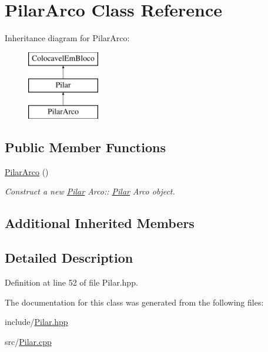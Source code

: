 \hypertarget{class_pilar_arco}{}\section{Pilar\+Arco Class Reference}
\label{class_pilar_arco}
Inheritance diagram for Pilar\+Arco\+:\begin{figure}[H]
\begin{center}
\leavevmode
\includegraphics[height=3.000000cm]{class_pilar_arco}
\end{center}
\end{figure}
\subsection*{Public Member Functions}
\begin{DoxyCompactItemize}
\item 
\mbox{\label{class_pilar_arco_a356e18041ea4a8e096327e591663157b}} 
\mbox{\hyperlink{class_pilar_arco_a356e18041ea4a8e096327e591663157b}{Pilar\+Arco}} ()
\begin{DoxyCompactList}\small\item\em Construct a new \mbox{\hyperlink{class_pilar}{Pilar}} Arco\+:\+: \mbox{\hyperlink{class_pilar}{Pilar}} Arco object. \end{DoxyCompactList}\end{DoxyCompactItemize}
\subsection*{Additional Inherited Members}


\subsection{Detailed Description}


Definition at line 52 of file Pilar.\+hpp.



The documentation for this class was generated from the following files\+:\begin{DoxyCompactItemize}
\item 
include/\mbox{\hyperlink{_pilar_8hpp}{Pilar.\+hpp}}\item 
src/\mbox{\hyperlink{_pilar_8cpp}{Pilar.\+cpp}}\end{DoxyCompactItemize}
